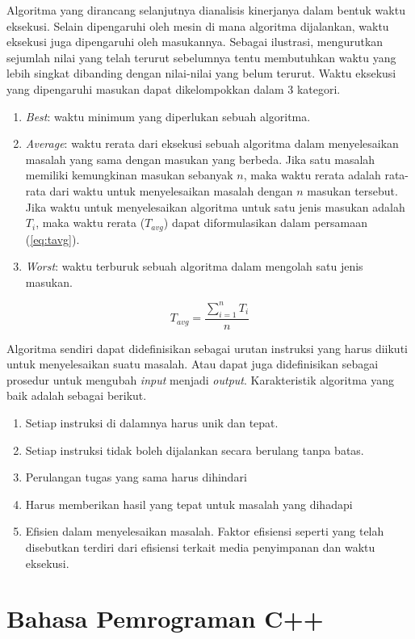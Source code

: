 Algoritma yang dirancang selanjutnya dianalisis kinerjanya dalam bentuk waktu eksekusi. Selain dipengaruhi oleh mesin di mana algoritma dijalankan, waktu eksekusi juga dipengaruhi oleh masukannya. Sebagai ilustrasi, mengurutkan sejumlah nilai yang telah terurut sebelumnya tentu membutuhkan waktu yang lebih singkat dibanding dengan nilai-nilai yang belum terurut. Waktu eksekusi yang dipengaruhi masukan dapat dikelompokkan dalam 3 kategori.
\begin{enumerate}
\item \textit{Best}: waktu minimum yang diperlukan sebuah algoritma.
\item \textit{Average}: waktu rerata dari eksekusi sebuah algoritma dalam menyelesaikan masalah yang sama dengan masukan yang berbeda. Jika satu masalah memiliki kemungkinan masukan sebanyak $n$, maka waktu rerata adalah rata-rata dari waktu untuk menyelesaikan masalah dengan $n$ masukan tersebut. Jika waktu untuk menyelesaikan algoritma untuk satu jenis masukan adalah $T_i$, maka waktu rerata ($T_{avg}$) dapat diformulasikan dalam persamaan (\ref{eq:tavg}).
\item \textit{Worst}: waktu terburuk sebuah algoritma dalam mengolah satu jenis masukan. 
\end{enumerate}

\begin{equation}
T_{avg}=\frac{\sum_{i=1}^{n}T_i}{n}
\label{eq:tavg}
\end{equation}

Algoritma sendiri dapat didefinisikan sebagai urutan instruksi yang harus diikuti untuk menyelesaikan suatu masalah. Atau dapat juga didefinisikan sebagai prosedur untuk mengubah \textit{input} menjadi \textit{output}. Karakteristik algoritma yang baik adalah sebagai berikut.
\begin{enumerate}
\item Setiap instruksi di dalamnya harus unik dan tepat.
\item Setiap instruksi tidak boleh dijalankan secara berulang tanpa batas.
\item Perulangan tugas yang sama harus dihindari
\item Harus memberikan hasil yang tepat untuk masalah yang dihadapi
\item Efisien dalam menyelesaikan masalah. Faktor efisiensi seperti yang telah disebutkan terdiri dari efisiensi terkait media penyimpanan dan waktu eksekusi.
\end{enumerate} 

\chapter{Bahasa Pemrograman C++}
